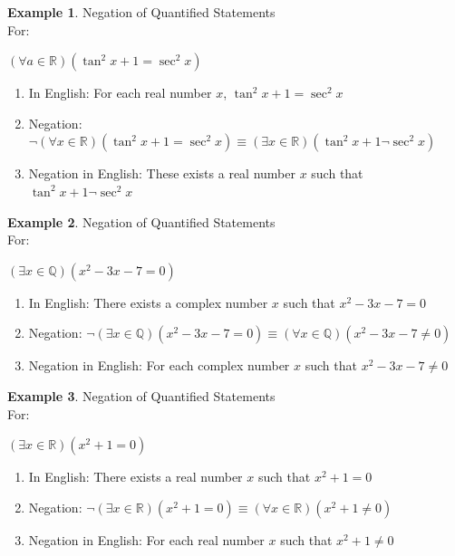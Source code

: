 \documentclass{book}
\theoremstyle{definition}
\newtheorem{example}{Example}[definition]
\theoremstyle{remark}
\newcommand{\bb}[1]{\mathbb{#1}}
\begin{document}
\begin{example}
Negation of Quantified Statements \cite[Chap.2, P.C.2.18, Q.3]{ted} \\

For: 
\begin{center}
    $(\forall a \in \bb{R})(\tan^2 x + 1 = \sec^2 x)$
\end{center}

\begin{enumerate}
    \item In English: For each real number $x$, $\tan^2 x + 1 = \sec^2 x$
    \item Negation: $\neg (\forall x \in \bb{R})(\tan^2 x + 1 = \sec^2 x) \equiv (\exists x \in \bb{R})(\tan^2 x + 1 \neg \sec^2 x)$
    \item Negation in English: These exists a real number $x$ such that $\tan^2 x + 1 \neg \sec^2 x$    
\end{enumerate}
\end{example}


\begin{example}
Negation of Quantified Statements \cite[Chap.2, P.C.2.18, Q.4]{ted} \\

For: 
\begin{center}
    $(\exists x \in \mathbb{Q})(x^2 - 3x - 7 = 0)$
\end{center}

\begin{enumerate}
    \item In English: There exists a complex number $x$ such that $x^2 - 3x - 7 = 0$ 
    \item Negation: $\neg (\exists x \in \mathbb{Q})(x^2 - 3x - 7 = 0) \equiv (\forall x \in \mathbb{Q})(x^2 - 3x - 7 \neq 0)$
    \item Negation in English: For each complex number $x$ such that $x^2 - 3x - 7 \neq 0$   
\end{enumerate}
\end{example}


\begin{example}
Negation of Quantified Statements \cite[Chap.2, P.C.2.18, Q.5]{ted} \\

For: 
\begin{center}
    $(\exists x \in \bb{R})(x^2 + 1 = 0)$
\end{center}

\begin{enumerate}
    \item In English: There exists a real number $x$ such that $x^2 + 1 = 0$ \\
\item Negation: $\neg (\exists x \in \bb{R})(x^2 + 1 = 0) \equiv (\forall x \in \bb{R})(x^2 + 1 \neq 0)$ \\
\item Negation in English: For each real number $x$ such that $x^2 + 1 \neq 0$ \\  
\end{enumerate}
\end{example}
 
\end{document}
